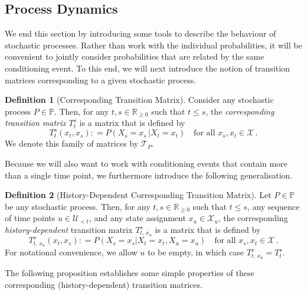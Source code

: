 \documentclass[10pt,a4paper]{paper}
\theoremstyle{definition}
\newtheorem{definition}{Definition}
\newcommand{\reals}{\mathbb{R}}
\newcommand{\realsnonneg}{\reals_{\geq 0}}
\newcommand{\states}{\mathcal{X}}
\newcommand{\processes}{\mathbb{P}}
\newcommand{\coloneqq}{:\!=}
\begin{document}
\subsection{Process Dynamics}\label{sec:dynamics}

We end this section by introducing some tools to describe the behaviour of stochastic processes. Rather than work with the individual probabilities, it will be convenient to jointly consider probabilities that are related by the same conditioning event. To this end, we will next introduce the notion of transition matrices corresponding to a given stochastic process.

\begin{definition}[Corresponding Transition Matrix]\label{def:trans_matrix}
Consider any stochastic process $P\in\processes$. Then, for any $t,s\in\realsnonneg$ such that $t\leq s$, the \emph{corresponding transition matrix} $T_t^s$ is a matrix that is defined by
\begin{equation*}
T_t^s(x_t, x_s) \coloneqq P(X_s=x_s\,\vert X_t=x_t)\quad\text{for all $x_s,x_t\in\states$}\,.
\end{equation*}
We denote this family of matrices by $\mathcal{T}_P$.%
\end{definition}

Because we will also want to work with conditioning events that contain more than a single time point, we furthermore introduce the following generalisation.

\begin{definition}[History-Dependent Corresponding Transition Matrix]
Let $P\in\processes$ be any stochastic process. Then, for any $t,s\in\realsnonneg$ such that $t\leq s$, any sequence of time points $u\in\mathcal{U}_{<t}$, and any state assignment $x_u\in\states_u$, the corresponding \emph{history-dependent} transition matrix $T_{t,\,x_u}^s$ is a matrix that is defined by
\begin{equation*}
T^s_{t,\,x_u}(x_t,x_s)
\coloneqq
P(X_s=x_s\vert X_t=x_t, X_u=x_u)\quad\text{for all $x_s,x_t\in\states$}\,.
\end{equation*}
For notational convenience, we allow $u$ to be empty, in which case $T_{t,\,x_u}^s=T_t^s$.
\end{definition}

The following proposition establishes some simple properties of these corresponding (history-dependent) transition matrices.
\end{document}
